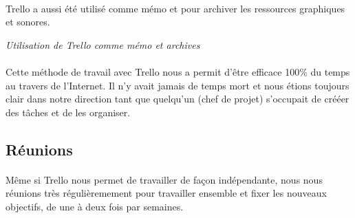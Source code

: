 \paragraph{}
Trello a aussi été utilisé comme mémo et pour archiver les ressources graphiques et sonores.

\noindent
{}
\begin{center}
\textit{Utilisation de Trello comme mémo et archives }
\end{center}

\paragraph{}
Cette méthode de travail avec Trello nous a permit d’être efficace 100\% du temps au travers de l’Internet. Il n’y avait jamais de temps mort et nous étions toujours clair dans notre direction tant que quelqu’un (chef de projet) s’occupait de crééer des tâches et de les organiser.

\subsection{Réunions}

\paragraph{}
Même si Trello nous permet de travailler de façon indépendante, nous nous réunions très régulièremement pour travailler ensemble et fixer les nouveaux objectifs, de une à deux fois par semaines.

